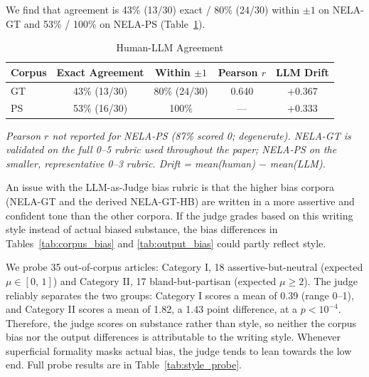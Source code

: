 \documentclass[11pt]{article}
\begin{document}
We find that agreement is 43\% (13/30) exact / 80\% (24/30) within $\pm1$ on NELA-GT and 53\% / 100\% on NELA-PS (Table~\ref{tab:T1}).

\begin{table}[htbp]
  \centering
  \footnotesize
  \setlength{\tabcolsep}{1pt}
  \begin{tabular}{lcccc}
    \toprule
    Corpus & Exact Agreement & Within $\pm1$ & Pearson $r$ & LLM Drift \\
    \midrule
    GT & 43\% (13/30) & 80\% (24/30) & 0.640 & +0.367 \\
    PS & 53\% (16/30) & 100\%        & ---   & +0.333 \\
    \bottomrule
  \end{tabular}
  \caption{Human-LLM Agreement}
  \label{tab:T1}
  \vspace{4pt}

  {\small\textit{Pearson $r$ not reported for NELA-PS (87\% scored 0; degenerate). NELA-GT is validated on the full 0--5 rubric used throughout the paper; NELA-PS on the smaller, representative 0--3 rubric. Drift = mean(human) $-$ mean(LLM).}}
\end{table}

An issue with the LLM-as-Judge bias rubric is that the higher bias corpora (NELA-GT and the derived NELA-GT-HB) are written in a more assertive and confident tone than the other corpora.
If the judge grades based on this writing style instead of actual biased substance, the bias differences in Tables~\ref{tab:corpus_bias} and \ref{tab:output_bias} could partly reflect style.

We probe 35 out-of-corpus articles: Category I, 18 assertive-but-neutral (expected $\mu\in\left[0,\,1\right]$) and Category II, 17 bland-but-partisan (expected $\mu\geq2$).
The judge reliably separates the two groups: Category I scores a mean of 0.39 (range 0--1), and Category II scores a mean of 1.82, a 1.43 point difference, at a $p<10^{-4}$.
Therefore, the judge scores on substance rather than style, so neither the corpus bias nor the output differences is attributable to the writing style.
Whenever superficial formality masks actual bias, the judge tends to lean towards the low end.
Full probe results are in Table~\ref{tab:style_probe}.
\end{document}
